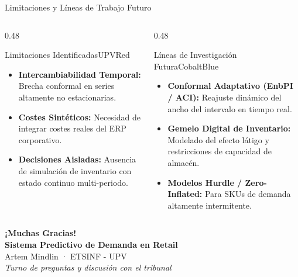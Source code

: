 \documentclass[aspectratio=169, 10pt]{beamer}
\begin{document}
\begin{frame}{Limitaciones y Líneas de Trabajo Futuro}
  \begin{columns}[T]
    \begin{column}{0.48\textwidth}
      \begin{statbox}{Limitaciones Identificadas}{UPVRed}
        \begin{itemize}\small
          \item \textbf{Intercambiabilidad Temporal:} Brecha conformal en series altamente no estacionarias.
          \item \textbf{Costes Sintéticos:} Necesidad de integrar costes reales del ERP corporativo.
          \item \textbf{Decisiones Aisladas:} Ausencia de simulación de inventario con estado continuo multi-periodo.
        \end{itemize}
      \end{statbox}
    \end{column}
    \begin{column}{0.48\textwidth}
      \begin{statbox}{Líneas de Investigación Futura}{CobaltBlue}
        \begin{itemize}\small
          \item \textbf{Conformal Adaptativo (EnbPI / ACI):} Reajuste dinámico del ancho del intervalo en tiempo real.
          \item \textbf{Gemelo Digital de Inventario:} Modelado del efecto látigo y restricciones de capacidad de almacén.
          \item \textbf{Modelos Hurdle / Zero-Inflated:} Para SKUs de demanda altamente intermitente.
        \end{itemize}
      \end{statbox}
    \end{column}
  \end{columns}
\end{frame}

\begin{frame}[standout]
  \Huge \textbf{¡Muchas Gracias!} \\[0.5cm]
  \Large \textbf{Sistema Predictivo de Demanda en Retail} \\[0.3cm]
  \normalsize Artem Mindlin · ETSINF - UPV \\[0.8cm]
  \small \textit{Turno de preguntas y discusión con el tribunal}
\end{frame}
\end{document}
